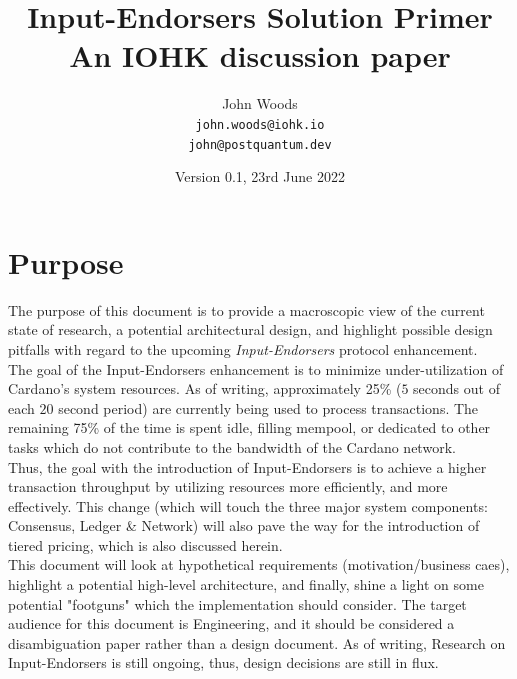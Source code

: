 \documentclass[11pt,a4paper]{article}
\begin{document}
\title {Input-Endorsers Solution Primer \\
       {\large \sc An IOHK discussion paper}}
\date  {Version 0.1, 23rd June 2022}
\author{John Woods         \\ {\small \texttt{john.woods@iohk.io}} \\
                              {\small \texttt{john@postquantum.dev}} \\
}

\maketitle

\section{Purpose}
The purpose of this document is to provide a macroscopic view of the current state of 
research, a potential architectural design, and highlight possible design pitfalls 
with regard to the upcoming \emph{Input-Endorsers} protocol enhancement. \\ 

The goal of the Input-Endorsers enhancement is to minimize under-utilization of Cardano's system resources.
As of writing, approximately 25\% ($5$ seconds out of each $20$ second period) are currently being used to process
transactions. The remaining 75\% of the time is spent idle, filling mempool, or dedicated to other tasks
which do not contribute to the bandwidth of the Cardano network. \\

Thus, the goal with the introduction of Input-Endorsers is to achieve a higher transaction throughput
by utilizing resources more efficiently, and more effectively. This change (which will touch the three 
major system components: Consensus, Ledger \& Network) will also pave the way for the introduction of tiered
pricing, which is also discussed herein. \\

This document will look at hypothetical requirements (motivation/business caes), highlight a potential high-level
architecture, and finally, shine a light on some potential "footguns" which the implementation should consider. 
The target audience for this document is Engineering, and it should be considered a disambiguation paper 
rather than a design document. As of writing, Research on Input-Endorsers is still ongoing, thus, design 
decisions are still in flux.
\pagebreak
\end{document}
